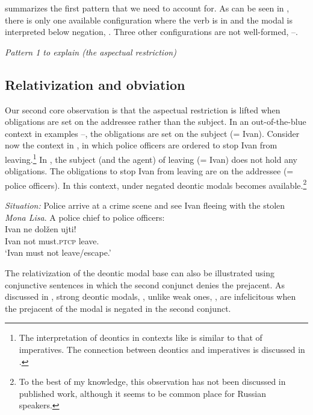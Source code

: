 \documentclass[output=paper,
modfonts,
newtxmath,colorlinks,citecolor=brown
]{langscibook}
\begin{document}
\noindent {} summarizes the first pattern that we need to account for. As can be seen in , there is only one available configuration where the verb is in \im and the modal is interpreted below negation, . Three other configurations are not well-formed, --. 

	\ea \textit{Pattern 1 to explain (the aspectual restriction)}\label{p11}
	\ea[\ding{51}]{$\neg \ \Box$ \im \label{p11a}}
    \ex[\ding{55}]{$\,\Box\ \neg$ \im \label{p11b}}
    \ex[\ding{55}]{$\,\neg \ \Box$ \p \label{p11c}}
    \ex[\ding{55}]{$\,\Box\ \neg$ \p \label{p11d}}
    \z\z


 \subsection{Relativization and obviation}
 Our second core observation is that the aspectual restriction is lifted when obligations are set on the addressee rather than the subject. In an out-of-the-blue context in examples --, the obligations are set on the subject (= Ivan). Consider now the context in , in which police officers are ordered to stop Ivan from leaving.\footnote{The interpretation of deontics in contexts like  is similar to that of imperatives. The connection between deontics and imperatives is discussed in .
 }
 In , the subject (and the agent) of leaving (= Ivan) does not hold any obligations. The obligations to stop Ivan from leaving are on the addressee (= police officers). In this context, \p under negated deontic modals becomes available.\footnote{To the best of my knowledge, this observation has not been discussed in published work, although it seems to be common place for Russian speakers.
 }
 


\ea \label{relat} \textit{Situation:} Police arrive at a crime scene and see Ivan fleeing with the stolen \emph{Mona Lisa}. A police chief to police officers:\\[5pt]
	{\gll  Ivan ne dolžen ujti!\\
	Ivan  not must.\textsc{ptcp} leave.\p \\
	\glt `Ivan must not leave/escape.'}
	\z 
        
\noindent The relativization of the deontic modal base can also be illustrated using conjunctive sentences in which the second conjunct denies the prejacent. As discussed in \citet{nin05}, strong deontic modals, , unlike weak ones, , are infelicitous when the prejacent of the modal is negated in the second conjunct. 
\end{document}
